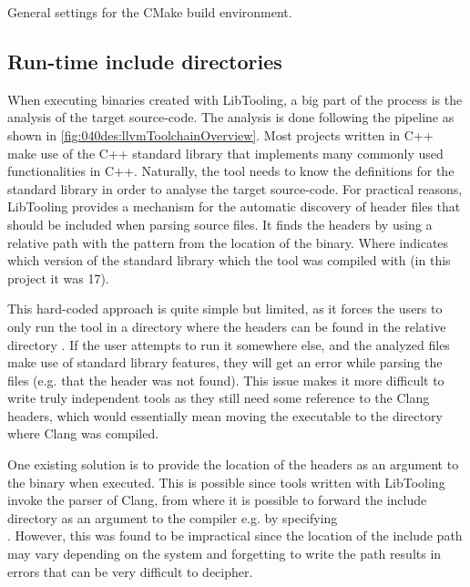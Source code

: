 \begin{listing}[H]
    \caption{General settings for the CMake build environment.}
    \label{code:080dev:cmake_base_settings}
\end{listing}

\subsection{Run-time include directories}\label{subsec:080dev:rt_include}
When executing binaries created with LibTooling, a big part of the process is the analysis of the target source-code. The analysis is done following the pipeline as shown in \cref{fig:040des:llvmToolchainOverview}. Most projects written in C++ make use of the C++ standard library that implements many commonly used functionalities in C++. Naturally, the tool needs to know the definitions for the standard library in order to analyse the target source-code. 
For practical reasons, LibTooling provides a mechanism for the automatic discovery of header files that should be included when parsing source files. It finds the headers by using a relative path with the pattern  from the location of the binary. Where  indicates which version of the standard library which the tool was compiled with (in this project it was 17).

This hard-coded approach is quite simple but limited, as it forces the users to only run the tool in a directory where the headers can be found in the relative directory .
If the user attempts to run it somewhere else, and the analyzed files make use of standard library features, they will get an error while parsing the files (e.g. that the header  was not found).
This issue makes it more difficult to write truly independent tools as they still need some reference to the Clang headers, which would essentially mean moving the executable to the directory where Clang was compiled.

One existing solution is to provide the location of the headers as an argument to the binary when executed. This is possible since tools written with LibTooling invoke the parser of Clang, from where it is possible to forward the include directory as an argument to the compiler e.g. by specifying\\.
However, this was found to be impractical since the location of the include path may vary depending on the system and forgetting to write the path results in errors that can be very difficult to decipher.

